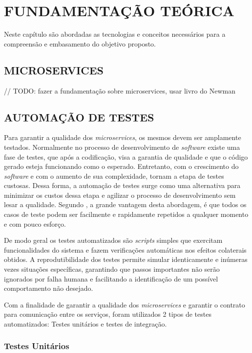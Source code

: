 \chapter{FUNDAMENTAÇÃO TEÓRICA}
\label{chap:02}

Neste capítulo são abordadas as tecnologias e conceitos necessários para a compreensão e embasamento do objetivo proposto.

\section{MICROSERVICES}

// TODO: fazer a fundamentação sobre microservices, usar livro do Newman

\section{AUTOMAÇÃO DE TESTES}

Para garantir a qualidade dos \textit{microservices}, os mesmos devem ser amplamente testados. Normalmente no processo de desenvolvimento de \textit{software} existe uma fase de testes, que após a codificação, visa a garantia de qualidade e que o código gerado esteja funcionando como o esperado. Entretanto, com o crescimento do \textit{software} e com o aumento de sua complexidade, tornam a etapa de testes custosas. Dessa forma, a automação de testes surge como uma alternativa para minimizar os custos dessa etapa e agilizar o processo de desenvolvimento sem lesar a qualidade. Segundo , a grande vantagem desta abordagem, é que todos os casos de teste podem ser facilmente e rapidamente repetidos a qualquer momento e com pouco esforço.

De modo geral os testes automatizados são \textit{scripts} simples que exercitam funcionalidades do sistema e fazem verificações automáticas nos efeitos colaterais obtidos. A reprodutibilidade dos testes permite simular identicamente e inúmeras vezes situações específicas, garantindo que passos importantes não serão ignorados por falha humana e facilitando a identificação de um possível comportamento não desejado. \cite{bernardo2008importancia}

Com a finalidade de garantir a qualidade dos \textit{microservices} e garantir o contrato para comunicação entre os serviços, foram utilizados 2 tipos de testes automatizados: Testes unitários e testes de integração.

\subsection{Testes Unitários}

